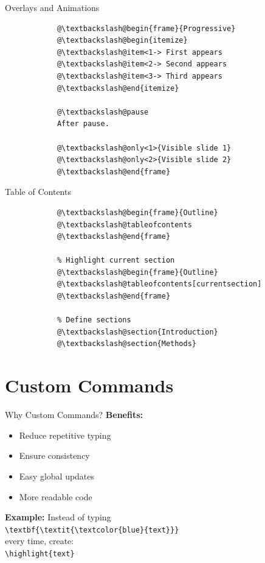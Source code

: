 \documentclass[aspectratio=169]{beamer}
\begin{document}
	\begin{frame}[fragile]{Overlays and Animations}
		\begin{lstlisting}
			@\textbackslash@begin{frame}{Progressive}
			@\textbackslash@begin{itemize}
			@\textbackslash@item<1-> First appears
			@\textbackslash@item<2-> Second appears
			@\textbackslash@item<3-> Third appears
			@\textbackslash@end{itemize}
			
			@\textbackslash@pause
			After pause.
			
			@\textbackslash@only<1>{Visible slide 1}
			@\textbackslash@only<2>{Visible slide 2}
			@\textbackslash@end{frame}
		\end{lstlisting}
	\end{frame}
	
	\begin{frame}[fragile]{Table of Contents}
		\begin{lstlisting}
			@\textbackslash@begin{frame}{Outline}
			@\textbackslash@tableofcontents
			@\textbackslash@end{frame}
			
			% Highlight current section
			@\textbackslash@begin{frame}{Outline}
			@\textbackslash@tableofcontents[currentsection]
			@\textbackslash@end{frame}
			
			% Define sections
			@\textbackslash@section{Introduction}
			@\textbackslash@section{Methods}
		\end{lstlisting}
	\end{frame}
	
	\section{Custom Commands}
	
	\begin{frame}{Why Custom Commands?}
		\textbf{Benefits:}
		\begin{itemize}
			\item Reduce repetitive typing
			\item Ensure consistency
			\item Easy global updates
			\item More readable code
		\end{itemize}
		
		\vspace{1em}
		
		\textbf{Example:} Instead of typing\\
		\texttt{\textbackslash textbf\{\textbackslash textit\{\textbackslash textcolor\{blue\}\{text\}\}\}}\\
		every time, create:\\
		\texttt{\textbackslash highlight\{text\}}
	\end{frame}
	
\end{document}
